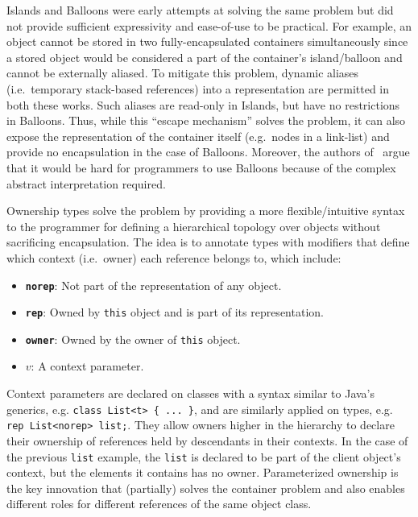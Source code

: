 \documentclass{acm_proc_article-sp}
\begin{document}
Islands and Balloons were early attempts at solving the same problem but did
not provide sufficient expressivity and ease-of-use to be practical. For
example, an object cannot be stored in two fully-encapsulated containers
simultaneously since a stored object would be considered a part of the
container's island/balloon and cannot be externally aliased. To mitigate this
problem, dynamic aliases (i.e.\ temporary stack-based references) into a
representation are permitted in both these works. Such aliases are read-only in
Islands, but have no restrictions in Balloons. Thus, while this ``escape
mechanism'' solves the problem, it can also expose the representation of the
container itself (e.g.\ nodes in a link-list) and provide no encapsulation in
the case of Balloons. Moreover, the authors of~\cite{noble98alias} argue that
it would be hard for programmers to use Balloons because of the complex
abstract interpretation required.

Ownership types solve the problem by providing a more flexible/intuitive syntax
to the programmer for defining a hierarchical topology over objects without
sacrificing encapsulation. The idea is to annotate types with modifiers
that define which context (i.e.\ owner) each reference belongs to, which
include: \vspace{-1ex}
\begin{itemize}
	\setlength\itemsep{-0.2ex}
	\item \textbf{\lstinline|norep|}:
		Not part of the representation of any object.
	\item \textbf{\lstinline|rep|}:
		Owned by \lstinline|this| object and is part of its representation.
	\item \textbf{\lstinline|owner|}:
		Owned by the owner of \lstinline|this| object.
	\item \textbf{$v$}:
		A context parameter.
\end{itemize} \vspace{-1ex}

Context parameters are declared on classes with a syntax similar to Java's
generics, e.g. \lstinline|class List<t> { ... }|, and are similarly applied on
types, e.g. \lstinline|rep List<norep> list;|. They allow owners higher in the
hierarchy to declare their ownership of references held by descendants in their
contexts. In the case of the previous \lstinline|list| example, the
\lstinline|list| is declared to be part of the client object's context, but the
elements it contains has no owner. Parameterized ownership is the key
innovation that (partially) solves the container problem and also enables
different roles for different references of the same object class.
\end{document}

